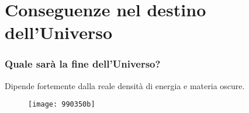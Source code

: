 \section[Conseguenze]{Conseguenze nel destino dell'Universo}

\begin{frame}
  \frametitle{Quale sarà la fine dell'Universo?}
  Dipende fortemente dalla reale densità di energia e materia oscure.
  \begin{figure}
    \centering
    \texttt{[image: 990350b]}
  \end{figure}
\end{frame}

